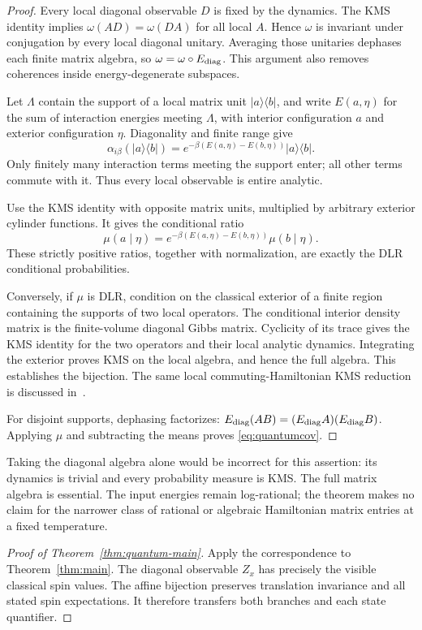 \begin{proof}
Every local diagonal observable \(D\) is fixed by the dynamics. The KMS identity implies \(\omega(AD)=\omega(DA)\) for all local \(A\). Hence \(\omega\) is invariant under conjugation by every local diagonal unitary. Averaging those unitaries dephases each finite matrix algebra, so
\(\omega=\omega\circ E_{\mathrm{diag}}\).
This argument also removes coherences inside energy-degenerate subspaces.

Let \(\Lambda\) contain the support of a local matrix unit \(|a\rangle\langle b|\), and write \(E(a,\eta)\) for the sum of interaction energies meeting \(\Lambda\), with interior configuration \(a\) and exterior configuration \(\eta\). Diagonality and finite range give
\begin{equation}
 \alpha_{i\beta}(|a\rangle\langle b|)
 =e^{-\beta(E(a,\eta)-E(b,\eta))}|a\rangle\langle b|.
\end{equation}
Only finitely many interaction terms meeting the support enter; all other terms commute with it. Thus every local observable is entire analytic.

Use the KMS identity with opposite matrix units, multiplied by arbitrary exterior cylinder functions. It gives the conditional ratio
\begin{equation}
 \mu(a\mid\eta)
 =e^{-\beta(E(a,\eta)-E(b,\eta))}\mu(b\mid\eta).
\end{equation}
These strictly positive ratios, together with normalization, are exactly the DLR conditional probabilities.

Conversely, if \(\mu\) is DLR, condition on the classical exterior of a finite region containing the supports of two local operators. The conditional interior density matrix is the finite-volume diagonal Gibbs matrix. Cyclicity of its trace gives the KMS identity for the two operators and their local analytic dynamics. Integrating the exterior proves KMS on the local algebra, and hence the full algebra. This establishes the bijection. The same local commuting-Hamiltonian KMS reduction is discussed in~\cite[Section 3.5]{FFS}.

For disjoint supports, dephasing factorizes:
\(E_{\mathrm{diag}}(AB)=(E_{\mathrm{diag}}A)(E_{\mathrm{diag}}B)\).
Applying \(\mu\) and subtracting the means proves \eqref{eq:quantumcov}.
\end{proof}

Taking the diagonal algebra alone would be incorrect for this assertion: its dynamics is trivial and every probability measure is KMS. The full matrix algebra is essential. The input energies remain log-rational; the theorem makes no claim for the narrower class of rational or algebraic Hamiltonian matrix entries at a fixed temperature.


\begin{proof}[Proof of Theorem~\ref{thm:quantum-main}]
Apply the correspondence to Theorem~\ref{thm:main}. The diagonal observable $Z_x$ has precisely the visible classical spin values. The affine bijection preserves translation invariance and all stated spin expectations. It therefore transfers both branches and each state quantifier.
\end{proof}
